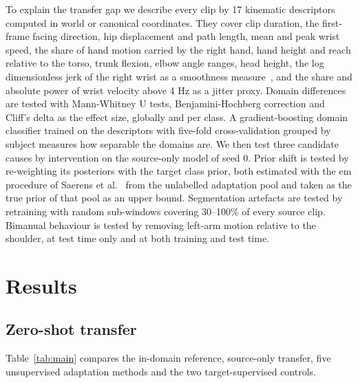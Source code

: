 \documentclass[Royal,sagev,times]{sagej}
\begin{document}
To explain the transfer gap we describe every clip by 17 kinematic descriptors
computed in world or canonical coordinates. They cover clip duration, the
first-frame facing direction, hip displacement and path length, mean and peak
wrist speed, the share of hand motion carried by the right hand, hand height
and reach relative to the torso, trunk flexion, elbow angle ranges, head
height, the log dimensionless jerk of the right wrist as a smoothness
measure~\cite{balasubramanian2015smoothness}, and the share and absolute power
of wrist velocity above 4 Hz as a jitter proxy. Domain differences are tested
with Mann-Whitney U tests, Benjamini-Hochberg correction and Cliff's delta as
the effect size, globally and per class. A gradient-boosting domain classifier
trained on the descriptors with five-fold cross-validation grouped by subject
measures how separable the domains are. We then test three candidate causes by
intervention on the source-only model of seed 0. Prior shift is tested by
re-weighting its posteriors with the target class prior, both estimated with
the \ac{em} procedure of Saerens et al.~\cite{saerens2002priors} from the
unlabelled adaptation pool and taken as the true prior of that pool as an upper
bound. Segmentation artefacts are tested by retraining with random sub-windows
covering 30--100\% of every source clip. Bimanual behaviour is tested by
removing left-arm motion relative to the shoulder, at test time only and at
both training and test time.

\section{Results}
\label{sec:results}

\subsection{Zero-shot transfer}

Table~\ref{tab:main} compares the in-domain reference, source-only transfer,
five unsupervised adaptation methods and the two target-supervised controls.
\end{document}
